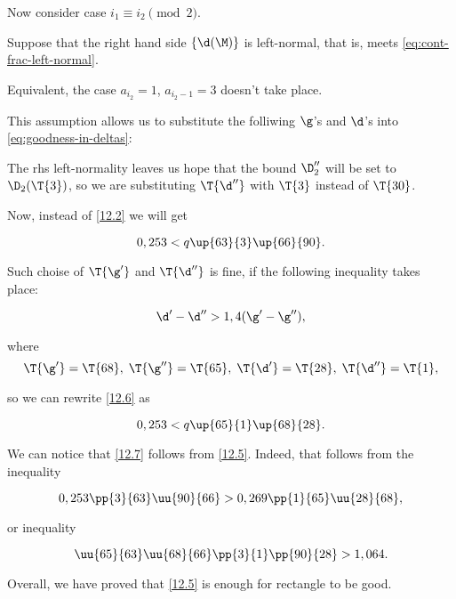 Now consider case $i_1 \equiv i_2 \pmod 2$.

Suppose that the right hand side $\{\d(\M)\}$ is left-normal,
that is, meets \ref{eq:cont-frac-left-normal}.

Equivalent, the case $a_{i_2} = 1$, $a_{i_2 - 1} = 3$ doesn't take place.


This assumption allows us to substitute the folliwing $\g$'s and $\d$'s
into \ref{eq:goodness-in-deltas}:
%

The rhs left-normality leaves us hope that the bound $\D_2''$
will be set to $\D_2(\T{3})$,
so we are substituting $\T{\d''}$ with $\T{3}$ instead of $\T{30}$.

Now, instead of \ref{12.2} we will get

\begin{equation}\label{12.5}
	0,253 < q \up{63}{3} \up{66}{90}.
\end{equation}

Such choise of $\T{\g'}$ and $\T{\d''}$ is fine,
if the following inequality takes place:

\begin{equation}\label{12.6}
	\d' - \d'' > 1,4 (\g' - \g''),
\end{equation}

where 
\begin{equation*}
	\T{\g'} = \T{68},\;
	\T{\g''} = \T{65},\;
	\T{\d'} = \T{28},\;
	\T{\d''} = \T{1},
\end{equation*}

so we can rewrite \ref{12.6} as

\begin{equation}\label{12.7}
	0,253 < q \up{65}{1} \up{68}{28}.
\end{equation}

We can notice that \ref{12.7} follows from \ref{12.5}. Indeed, that follows from the inequality

\begin{equation*}
	0,253 \pp{3}{63} \uu{90}{66}
	>
	0,269 \pp{1}{65} \uu{28}{68},
\end{equation*}

or inequality

\begin{equation*}
	\uu{65}{63} \uu{68}{66} \pp{3}{1} \pp{90}{28}
	>
	1,064.
\end{equation*}

Overall, we have proved that \ref{12.5} is enough for rectangle to be good.

